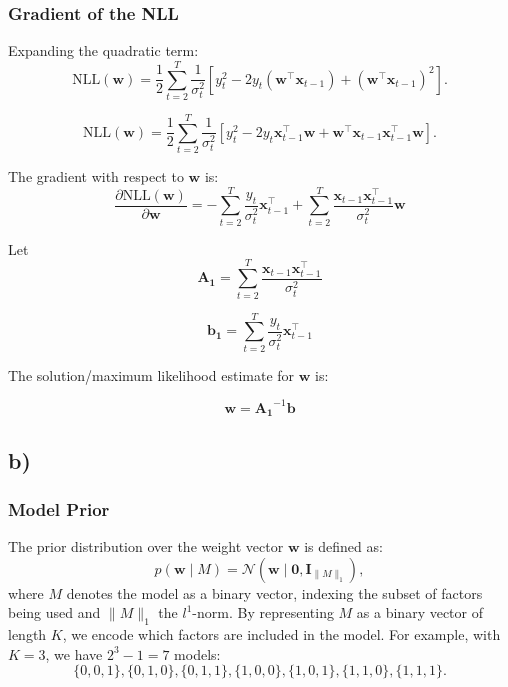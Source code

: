 \documentclass{article}
\begin{document}
\subsubsection*{Gradient of the NLL}
Expanding the quadratic term:
\[
\text{NLL}(\mathbf{w}) = \frac{1}{2} \sum_{t=2}^T \frac{1}{\sigma_t^2} \left[ y_t^2 - 2 y_t (\mathbf{w}^\top \mathbf{x}_{t-1}) + (\mathbf{w}^\top \mathbf{x}_{t-1})^2 \right].
\]

\[
\text{NLL}(\mathbf{w}) = \frac{1}{2} \sum_{t=2}^T \frac{1}{\sigma_t^2} \left[ y_t^2 - 2 y_t \mathbf{x}_{t-1}^\top \mathbf{w} + \mathbf{w}^\top \mathbf{x}_{t-1} \mathbf{x}_{t-1}^\top  \mathbf{w} \right].
\]



The gradient with respect to $\mathbf{w}$ is:
\[
\frac{\partial \text{NLL}(\mathbf{w})}{\partial \mathbf{w}} = -\sum_{t=2}^T \frac{y_t}{\sigma_t^2} \mathbf{x}_{t-1}^\top + \sum_{t=2}^T \frac{\mathbf{x}_{t-1} \mathbf{x}_{t-1}^\top }{\sigma_t^2} \mathbf{w}
\]

Let 
\[ \mathbf{A_1}  =  \sum_{t=2}^T \frac{\mathbf{x}_{t-1} \mathbf{x}_{t-1}^\top }{\sigma_t^2} \]

\[\mathbf{b_1} = \sum_{t=2}^T \frac{y_t}{\sigma_t^2} \mathbf{x}_{t-1}^\top  \]

The solution/maximum likelihood estimate for $\mathbf{w}$ is:

\[
\mathbf{w} = \mathbf{A_1}^{-1} \mathbf{b}
\]





\subsection*{b)}


\subsubsection*{Model Prior}

The prior distribution over the weight vector $\boldsymbol{w}$ is defined as:
\[
p(\boldsymbol{w} \mid M) = \mathcal{N}(\boldsymbol{w} \mid \boldsymbol{0}, \boldsymbol{I}_{\|M\|_1}),
\]
where $M$ denotes the model as a binary vector, indexing the subset of factors being used and $\|M\|_1$ the $l^1\text{-norm}$. By representing $M$ as a binary vector of length $K$, we encode which factors are included in the model. For example, with $K=3$, we have $2^3 - 1 = 7$ models:
\[
\{0,0,1\}, \{0,1,0\}, \{0,1,1\}, \{1,0,0\}, \{1,0,1\}, \{1,1,0\}, \{1,1,1\}.
\]
\end{document}
